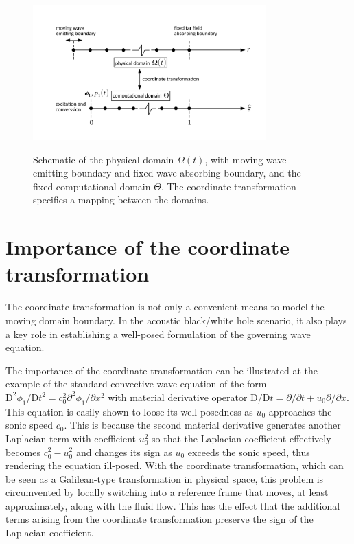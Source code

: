 \begin{figure}
    {\includegraphics[width=0.8\textwidth]{figures/domains.pdf}}
    \caption{Schematic of the physical domain $\Omega\left(t\right)$, with moving wave-emitting boundary and fixed wave absorbing boundary, and the fixed computational domain $\Theta$. The coordinate transformation specifies a mapping between the domains.}
    \label{fig:domains}
\end{figure}


\section{Importance of the coordinate transformation}
\label{sec:Importance of the coordinate transformation}

The coordinate transformation is not only a convenient means to model the moving domain boundary. In the acoustic black/white hole scenario, it also plays a key role in establishing a well-posed formulation of the governing wave equation.

The importance of the coordinate transformation can be illustrated at the example of the standard convective wave equation of the form $\mathrm{D}^2\phi_1/\mathrm{D}t^2 = c_0^2\partial^2\phi_1/\partial x^2$ with material derivative operator $\mathrm{D}/\mathrm{D}t = \partial/\partial t + u_0\partial/\partial x$. This equation is easily shown to loose its well-posedness as $u_0$ approaches the sonic speed $c_0$. This is because the second material derivative generates another Laplacian term with coefficient $u_0^2$ so that the Laplacian coefficient effectively becomes $c_0^2-u_0^2$ and changes its sign as $u_0$ exceeds the sonic speed, thus rendering the equation ill-posed. With the coordinate transformation, which can be seen as a Galilean-type transformation in physical space, this problem is circumvented by locally switching into a reference frame that moves, at least approximately, along with the fluid flow. This has the effect that the additional terms arising from the coordinate transformation preserve the sign of the Laplacian coefficient.
